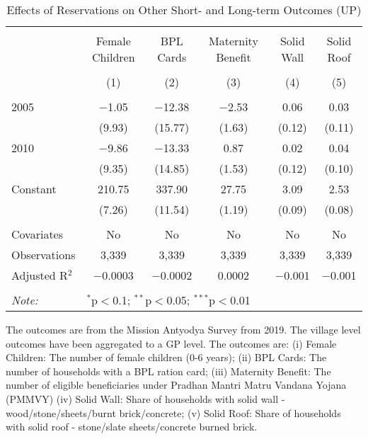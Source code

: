 \begin{table}[!htbp]
\centering
\begin{threeparttable}

  \caption{Effects of Reservations on Other Short- and Long-term Outcomes (UP)} 
  \label{raj_shrug_other_05_10} 
\scriptsize 
\begin{tabular}{@{\extracolsep{0pt}}lccccc} 
\\[-1.8ex]\hline 
\hline \\[-1.8ex] 
 & Female Children & BPL Cards & Maternity Benefit & Solid Wall & Solid Roof \\ 
\\[-1.8ex] & (1) & (2) & (3) & (4) & (5)\\ 
\hline \\[-1.8ex] 
 2005 & $-$1.05 & $-$12.38 & $-$2.53 & 0.06 & 0.03 \\ 
  & (9.93) & (15.77) & (1.63) & (0.12) & (0.11) \\ 
  2010 & $-$9.86 & $-$13.33 & 0.87 & 0.02 & 0.04 \\ 
  & (9.35) & (14.85) & (1.53) & (0.12) & (0.10) \\ 
  Constant & 210.75 & 337.90 & 27.75 & 3.09 & 2.53 \\ 
  & (7.26) & (11.54) & (1.19) & (0.09) & (0.08) \\ 
 \hline \\[-1.8ex] 
Covariates & No & No & No & No & No \\ 
Observations & 3,339 & 3,339 & 3,339 & 3,339 & 3,339 \\ 
Adjusted R$^{2}$ & $-$0.0003 & $-$0.0002 & 0.0002 & $-$0.001 & $-$0.001 \\ 
\hline 
\hline \\[-1.8ex] 
\textit{Note:}  & \multicolumn{5}{l}{$^{*}$p$<$0.1; $^{**}$p$<$0.05; $^{***}$p$<$0.01} \\ 
\end{tabular} 
\begin{tablenotes}[flushleft]
\scriptsize
\item The outcomes are from the Mission Antyodya Survey from 2019. 
                   The village level outcomes have been aggregated to a GP level. The outcomes are: 
                     (i) Female Children: The number of female children (0-6 years);
                     (ii) BPL Cards: The number of households with a BPL ration card;
                     (iii) Maternity Benefit: The number of eligible beneficiaries under Pradhan Mantri Matru Vandana Yojana (PMMVY)
                     (iv) Solid Wall: Share of households with solid wall - wood/stone/sheets/burnt brick/concrete;
                     (v) Solid Roof: Share of households with solid roof - stone/slate sheets/concrete burned brick.
\end{tablenotes}
\end{threeparttable}
\end{table}
